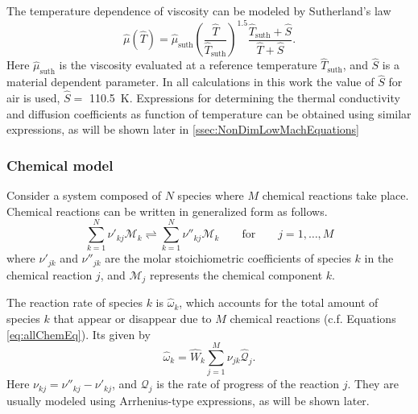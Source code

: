 The temperature dependence of viscosity can be modeled by Sutherland's law \citep{sutherlandLIIViscosityGases1893}
\begin{equation}\label{eq:DimSutherland}
\hat{\mu}(\hat{T}) = \hat{\mu}_{\text{suth}}\left(\frac{\hat{T}}{\hat{T}_{\text{suth}}}\right)^{1.5}\frac{\hat{T}_{\text{suth}} + \hat{S}}{\hat{T}+\hat{S}}.
\end{equation}
Here $\hat{\mu}_{\text{suth}}$ is the viscosity evaluated at a reference temperature $\hat{T}_{\text{suth}}$, and $\hat S$ is a material dependent parameter. In all calculations in this work the value of $\hat{S}$ for air is used, $\hat{S} = $ \SI{110.5}{\kelvin}. Expressions for determining the thermal conductivity and diffusion coefficients as function of temperature can be obtained using similar expressions, as will be shown later in \cref{ssec:NonDimLowMachEquations}

\subsubsection{Chemical model} 
Consider a system composed of $N$ species where $M$ chemical reactions take place. Chemical reactions can be written in generalized form as follows.
\begin{equation}\label{eq:allChemEq}
\sum_{k=1}^{N} \nu'_{kj}\mathcal{M}_k  \rightleftharpoons \sum_{k=1}^{N} \nu''_{kj}\mathcal{M}_k  \qquad \text{for}\qquad j=1,\dots,M 
\end{equation}
where $\nu'_{jk}$ and $\nu''_{jk}$ are the molar stoichiometric coefficients of species $k$ in the chemical reaction $j$, and $\mathcal{M}_j$ represents the chemical component $k$. \newline

The reaction rate of species $k$ is $\hat \omega_k$, which accounts for the total amount of species $k$ that appear or disappear due to $M$ chemical reactions (c.f. Equations \eqref{eq:allChemEq}). Its given by
\begin{equation} \label{eq:reacRateDef}
\hat \omega_k  = \hat W_k \sum_{j=1}^{M}\nu_{jk}\hat{\mathcal{Q}}_j.
\end{equation}
Here $\nu_{kj} = \nu''_{kj} -\nu'_{kj}$, and $\mathcal{Q}_j$ is the rate of progress of the reaction $j$. They are usually modeled using Arrhenius-type expressions, as will be shown later. 
\newline

